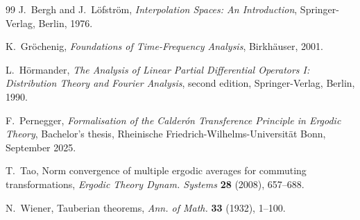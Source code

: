 \documentclass[12pt,reqno]{amsart}
\theoremstyle{plain}
\numberwithin{equation}{section}
\theoremstyle{remark}
\begin{document}
\begin{thebibliography}{99}
J.~Bergh and J.~L\"ofstr\"om,
\emph{Interpolation Spaces: An Introduction},
Springer-Verlag, Berlin, 1976.

K.~Gr\"ochenig,
\emph{Foundations of Time-Frequency Analysis},
Birkh\"auser, 2001.

L.~H\"ormander,
\emph{The Analysis of Linear Partial Differential Operators I: Distribution Theory and Fourier Analysis},
second edition, Springer-Verlag, Berlin, 1990.

F.~Pernegger,
\emph{Formalisation of the Calder\'on Transference Principle in Ergodic Theory},
Bachelor's thesis, Rheinische Friedrich-Wilhelms-Universit\"at Bonn, September 2025.

T.~Tao,
Norm convergence of multiple ergodic averages for commuting transformations,
\emph{Ergodic Theory Dynam. Systems} \textbf{28} (2008), 657--688.

N.~Wiener,
Tauberian theorems,
\emph{Ann. of Math.} \textbf{33} (1932), 1--100.
\end{thebibliography}
\end{document}
